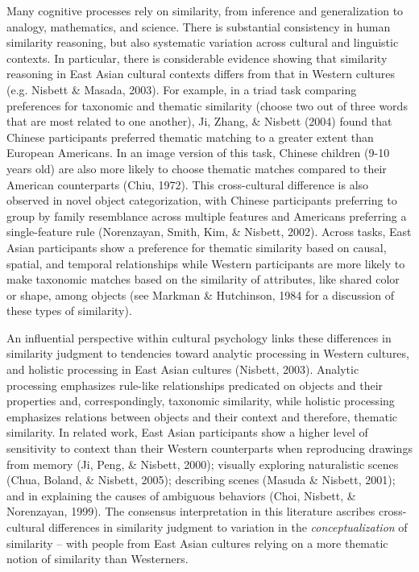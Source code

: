 \documentclass[10pt, letterpaper]{article}
\begin{document}
Many cognitive processes rely on similarity, from inference and
generalization to analogy, mathematics, and science. There is
substantial consistency in human similarity reasoning, but also
systematic variation across cultural and linguistic contexts. In
particular, there is considerable evidence showing that similarity
reasoning in East Asian cultural contexts differs from that in Western
cultures (e.g. Nisbett \& Masada, 2003). For example, in a triad task
comparing preferences for taxonomic and thematic similarity (choose two
out of three words that are most related to one another), Ji, Zhang, \&
Nisbett (2004) found that Chinese participants preferred thematic
matching to a greater extent than European Americans. In an image
version of this task, Chinese children (9-10 years old) are also more
likely to choose thematic matches compared to their American
counterparts (Chiu, 1972). This cross-cultural difference is also
observed in novel object categorization, with Chinese participants
preferring to group by family resemblance across multiple features and
Americans preferring a single-feature rule (Norenzayan, Smith, Kim, \&
Nisbett, 2002). Across tasks, East Asian participants show a preference
for thematic similarity based on causal, spatial, and temporal
relationships while Western participants are more likely to make
taxonomic matches based on the similarity of attributes, like shared
color or shape, among objects (see Markman \& Hutchinson, 1984 for a
discussion of these types of similarity).

An influential perspective within cultural psychology links these
differences in similarity judgment to tendencies toward analytic
processing in Western cultures, and holistic processing in East Asian
cultures (Nisbett, 2003). Analytic processing emphasizes rule-like
relationships predicated on objects and their properties and,
correspondingly, taxonomic similarity, while holistic processing
emphasizes relations between objects and their context and therefore,
thematic similarity. In related work, East Asian participants show a
higher level of sensitivity to context than their Western counterparts
when reproducing drawings from memory (Ji, Peng, \& Nisbett, 2000);
visually exploring naturalistic scenes (Chua, Boland, \& Nisbett, 2005);
describing scenes (Masuda \& Nisbett, 2001); and in explaining the
causes of ambiguous behaviors (Choi, Nisbett, \& Norenzayan, 1999). The
consensus interpretation in this literature ascribes cross-cultural
differences in similarity judgment to variation in the
\emph{conceptualization} of similarity -- with people from East Asian
cultures relying on a more thematic notion of similarity than
Westerners.
\end{document}
